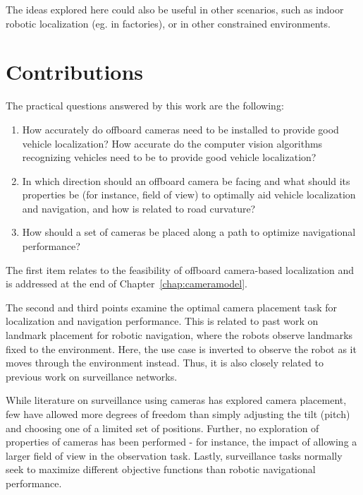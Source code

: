 \documentclass[a4paper,12pt,twoside,openright]{report}
\begin{document}
The ideas explored here could also be useful in other scenarios, such as indoor
robotic localization (eg. in factories), or in other constrained environments.

\section{Contributions}

The practical questions answered by this work are the following:
\begin{enumerate}
    \item How accurately do offboard cameras need to be installed to provide good vehicle localization? How accurate do the computer vision
    algorithms recognizing vehicles need to be to provide good vehicle localization?
    \item In which direction should an offboard camera be facing and what should its properties be (for instance, field of view)
          to optimally aid vehicle localization and navigation, and how is related to road curvature?
    \item How should a set of cameras be placed along a path to optimize navigational performance?
\end{enumerate}

The first item relates to the feasibility of offboard camera-based localization
and is addressed at the end of Chapter~\ref{chap:cameramodel}.

The second and third points examine the optimal camera placement task 
for localization and navigation performance. This is related to past work 
on landmark placement for robotic navigation, where the robots observe landmarks fixed to the environment. 
Here, the use case is inverted to observe the robot as it moves through the environment instead. 
Thus, it is also closely related to previous work on surveillance networks.

While literature on surveillance using cameras has explored camera placement, few
have allowed more degrees of freedom than simply adjusting the tilt (pitch) 
and choosing one of a limited set of positions. Further, no exploration of 
properties of cameras has been performed - for instance, the impact
of allowing a larger field of view in the observation task. Lastly, surveillance
tasks normally seek to maximize different objective functions than robotic
navigational performance.
\end{document}
